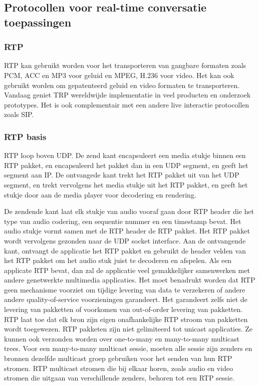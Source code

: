 \subsection{Protocollen voor real-time conversatie toepassingen}

\subsubsection{RTP}

RTP kan gebruikt worden voor het transporteren van gangbare formaten zoals PCM, ACC en MP3 voor geluid en MPEG, H.236 voor video. Het kan ook gebruikt worden om gepatenteerd geluid en video formaten te transporteren. Vandaag geniet TRP wereldwijde implementatie in veel producten en onderzoek prototypes. Het is ook complementair met een andere live interactie protocollen zoals SIP.

\subsubsection{RTP basis}

RTP loop boven UDP. De zend kant encapsuleert een media stukje binnen een RTP pakket, en encapsuleerd het pakket dan in een UDP segment, en geeft het segment aan IP. De ontvangede kant trekt het RTP pakket uit van het UDP segment, en trekt vervolgens het media stukje uit het RTP pakket, en geeft het stukje door aan de media player voor decodering en rendering.

De zendende kant laat elk stukje van audio vooraf gaan door RTP header die het type van audio codering, een sequentie nummer en een timestamp bevat. Het audio stukje vormt samen met de RTP header de RTP pakket. Het RTP pakket wordt vervolgens gezonden naar de UDP socket interface. Aan de ontvangende kant, ontvangt de applicatie het RTP pakket en gebruikt de header velden van het RTP pakket om het audio stuk juist te decoderen en afspelen.
Als een applicate RTP bevat, dan zal de applicatie veel gemakkelijker samenwerken met andere genetwerkte multimedia applicaties.
Het moet benadrukt worden dat RTP geen mechanisme voorziet om tijdige levering van data te verzekeren of andere andere quality-of-service voorzieningen garandeert. Het garandeert zelfs niet de levering van pakketten of voorkomen van out-of-order levering van pakketten.
RTP laat toe dat elk bron zijn eigen onafhankelijke RTP stroom van pakketten wordt toegewezen. RTP pakketen zijn niet gelimiteerd tot unicast applicaties. Ze kunnen ook verzonden worden over one-to-many en many-to-many multicast trees. Voor een many-to-many multicast sessie, moeten alle sessie zijn zenders en bronnen dezelfde multicast groep gebruiken voor het senden van hun RTP stromen. RTP multicast stromen die bij elkaar horen, zoals audio en video stromen die uitgaan van verschillende zenders, behoren tot een RTP sessie.

